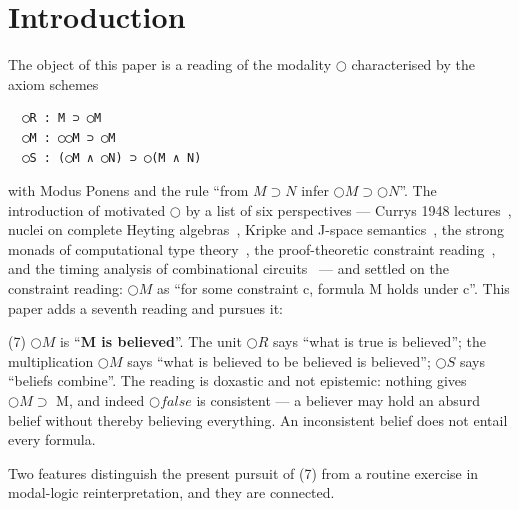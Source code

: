 \section{Introduction}\label{1-introduction}

The object of this paper is a reading of the modality \ensuremath{\bigcirc}
characterised by the axiom schemes

\begin{lstlisting}
  ◯R : M ⊃ ◯M
  ◯M : ◯◯M ⊃ ◯M
  ◯S : (◯M ∧ ◯N) ⊃ ◯(M ∧ N)
\end{lstlisting}

with Modus Ponens and the rule ``from \ensuremath{M \supset N} infer \ensuremath{\bigcirc M \supset \bigcirc N}''. The
introduction of \cite{FairtloughMendler1997} motivated \ensuremath{\bigcirc} by a list of six perspectives ---
Curry\textquotesingle s 1948 lectures~\cite{Curry1950,Curry1952}, nuclei on complete
Heyting algebras~\cite{Macnab1981,Johnstone1982,PicadoPultr2012}, Kripke
and J-space semantics~\cite{Kripke1965,Goldblatt1981,Simpson1994}, the
strong monads of computational type
theory~\cite{Moggi1991,BentonBiermanDePaiva1998,Kobayashi1997,
PfenningDavies2001},
the proof-theoretic constraint
reading~\cite{FairtloughMendlerWalton1997}, and the timing analysis of
combinational circuits~\cite{Mendler2000} --- and settled on the constraint reading: \ensuremath{\bigcirc M} as
``for some constraint c, formula M holds under c''. This paper adds a
seventh reading and pursues it:

(7) \ensuremath{\bigcirc M} is ``\textbf{M is believed}''. The unit \ensuremath{\bigcirc R} says ``what is true is
believed''; the multiplication \ensuremath{\bigcirc M} says ``what is believed to be believed
is believed''; \ensuremath{\bigcirc S} says ``beliefs combine''. The reading is doxastic and
not epistemic: nothing gives \ensuremath{\bigcirc M \supset} M, and indeed \ensuremath{\bigcirc\mathit{false}} is consistent ---
a believer may hold an absurd belief without thereby believing
everything. An inconsistent belief does not entail every formula.

Two features distinguish the present pursuit of (7) from a routine
exercise in modal-logic reinterpretation, and they are connected.

